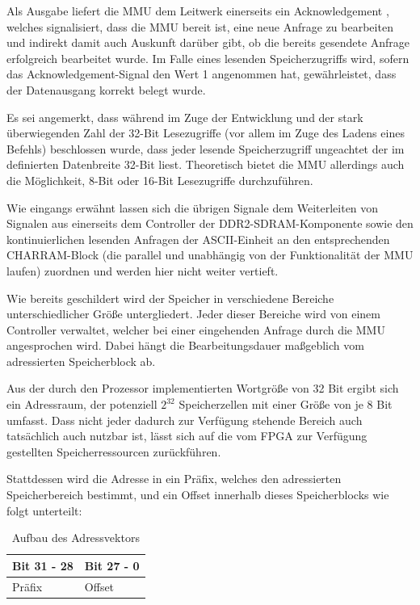 Als Ausgabe liefert die MMU dem Leitwerk einerseits ein Acknowledgement , welches signalisiert, dass die MMU bereit ist, eine neue Anfrage zu bearbeiten und indirekt damit auch Auskunft dar\"uber gibt, ob die bereits gesendete Anfrage erfolgreich bearbeitet wurde. Im Falle eines lesenden Speicherzugriffs wird, sofern das Acknowledgement-Signal den Wert 1 angenommen hat, gew\"ahrleistet, dass der Datenausgang  korrekt belegt wurde.

Es sei angemerkt, dass w\"ahrend im Zuge der Entwicklung und der stark \"uberwiegenden Zahl der 32-Bit Lesezugriffe (vor allem im Zuge des Ladens eines Befehls) beschlossen wurde, dass jeder lesende Speicherzugriff ungeachtet der im  definierten Datenbreite 32-Bit liest. Theoretisch bietet die MMU allerdings auch die M\"oglichkeit, 8-Bit oder 16-Bit Lesezugriffe durchzuf\"uhren.


Wie eingangs erw\"ahnt lassen sich die \"ubrigen Signale dem Weiterleiten von Signalen aus einerseits dem Controller der DDR2-SDRAM-Komponente sowie den kontinuierlichen lesenden Anfragen der ASCII-Einheit an den entsprechenden CHARRAM-Block (die parallel und unabh\"angig von der Funktionalit\"at der MMU laufen) zuordnen und werden hier nicht weiter vertieft.


Wie bereits geschildert wird der Speicher in verschiedene Bereiche unterschiedlicher Gr\"o\ss{}e untergliedert. Jeder dieser Bereiche wird von einem Controller verwaltet, welcher bei einer eingehenden Anfrage durch die MMU angesprochen wird. Dabei h\"angt die Bearbeitungsdauer ma\ss{}geblich vom adressierten Speicherblock ab.

Aus der durch den Prozessor implementierten Wortgr\"o\ss{}e von 32 Bit ergibt sich ein Adressraum, der potenziell $2^{32}$ Speicherzellen mit einer Gr\"o\ss{}e von je 8 Bit umfasst. Dass nicht jeder dadurch zur Verf\"ugung stehende Bereich auch tats\"achlich auch nutzbar ist, l\"asst sich auf die vom FPGA zur Verf\"ugung gestellten Speicherressourcen zur\"uckf\"uhren.

Stattdessen wird die Adresse in ein Pr\"afix, welches den adressierten Speicherbereich bestimmt, und ein Offset innerhalb dieses Speicherblocks wie folgt unterteilt:

\begin{table}[H]
\begin{center}
	\begin{tabular}{| l | l |}
		\hline
		Bit 31 - 28 & Bit 27 - 0 \\ \hline
		Pr\"afix & Offset \\ \hline
	\end{tabular}
\end{center}
\caption{Aufbau des Adressvektors}
\end{table}

